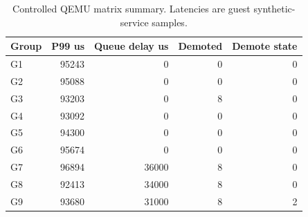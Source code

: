 
\begin{table}[t]
\centering
\scriptsize
\caption{Controlled QEMU matrix summary. Latencies are guest synthetic-service samples.}
\begin{tabular}{lrrrr}
\toprule
Group & P99 us & Queue delay us & Demoted & Demote state \\
\midrule
G1 & 95243 & 0 & 0 & 0 \\
G2 & 95088 & 0 & 0 & 0 \\
G3 & 93203 & 0 & 8 & 0 \\
G4 & 93092 & 0 & 0 & 0 \\
G5 & 94300 & 0 & 0 & 0 \\
G6 & 95674 & 0 & 0 & 0 \\
G7 & 96894 & 36000 & 8 & 0 \\
G8 & 92413 & 34000 & 8 & 0 \\
G9 & 93680 & 31000 & 8 & 2 \\
\bottomrule
\end{tabular}
\end{table}
